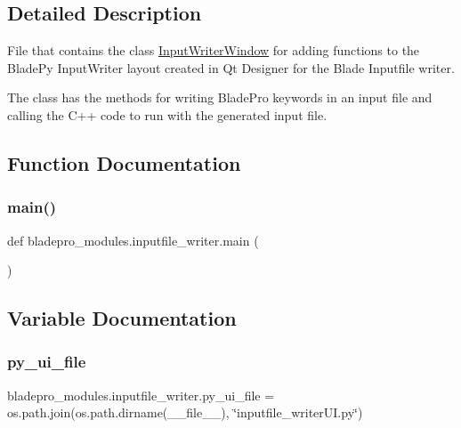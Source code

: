 \subsection{Detailed Description}
File that contains the class \hyperlink{classbladepro__modules_1_1inputfile__writer_1_1_input_writer_window}{Input\+Writer\+Window} for adding functions to the Blade\+Py Input\+Writer layout created in Qt Designer for the Blade Inputfile writer. 

The class has the methods for writing Blade\+Pro keywords in an input file and calling the C++ code to run with the generated input file. 

\subsection{Function Documentation}
\hypertarget{namespacebladepro__modules_1_1inputfile__writer_af7196fb030213564f7a096e5437b03c6}{}\label{namespacebladepro__modules_1_1inputfile__writer_af7196fb030213564f7a096e5437b03c6} 
\subsubsection{\texorpdfstring{main()}{main()}}
{\footnotesize\ttfamily def bladepro\+\_\+modules.\+inputfile\+\_\+writer.\+main (\begin{DoxyParamCaption}{ }\end{DoxyParamCaption})}



\subsection{Variable Documentation}
\hypertarget{namespacebladepro__modules_1_1inputfile__writer_ad7ae10efada37c5353710ada1cb4b756}{}\label{namespacebladepro__modules_1_1inputfile__writer_ad7ae10efada37c5353710ada1cb4b756} 
\subsubsection{\texorpdfstring{py\+\_\+ui\+\_\+file}{py\_ui\_file}}
{\footnotesize\ttfamily bladepro\+\_\+modules.\+inputfile\+\_\+writer.\+py\+\_\+ui\+\_\+file = os.\+path.\+join(os.\+path.\+dirname(\+\_\+\+\_\+file\+\_\+\+\_\+), \char`\"{}inputfile\+\_\+writer\+U\+I.\+py\char`\"{})}

